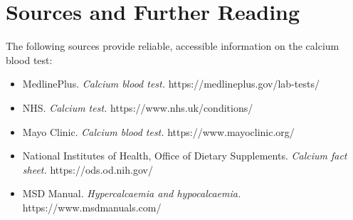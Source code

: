 \section*{Sources and Further Reading}
The following sources provide reliable, accessible information on the calcium blood test:
\begin{itemize}
    \item MedlinePlus. \textit{Calcium blood test.} https://medlineplus.gov/lab-tests/
    \item NHS. \textit{Calcium test.} https://www.nhs.uk/conditions/
    \item Mayo Clinic. \textit{Calcium blood test.} https://www.mayoclinic.org/
    \item National Institutes of Health, Office of Dietary Supplements. \textit{Calcium fact sheet.} https://ods.od.nih.gov/
    \item MSD Manual. \textit{Hypercalcaemia and hypocalcaemia.} https://www.msdmanuals.com/
\end{itemize}

